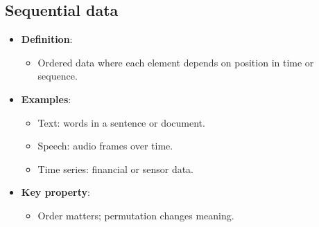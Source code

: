 \documentclass[xcolor=table]{beamer}
\begin{document}
	\subsection{Sequential data}
	
	\begin{subsectionframe}
		\begin{itemize}
			\item \textbf{Definition}:
			\begin{itemize}
				\item Ordered data where each element depends on position in time or sequence.
			\end{itemize}
			
			\item \textbf{Examples}:
			\begin{itemize}
				\item Text: words in a sentence or document.
				\item Speech: audio frames over time.
				\item Time series: financial or sensor data.
			\end{itemize}
			
			\item \textbf{Key property}:
			\begin{itemize}
				\item Order matters; permutation changes meaning.
			\end{itemize}
			
		\end{itemize}
	\end{subsectionframe}
	
\end{document}
